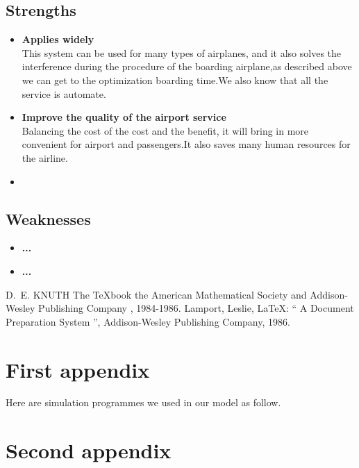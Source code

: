 \documentclass{mcmthesis}
\begin{document}
\subsection{Strengths}
\begin{itemize}
\item \textbf{Applies widely}\\
This  system can be used for many types of airplanes, and it also
solves the interference during  the procedure of the boarding
airplane,as described above we can get to the  optimization
boarding time.We also know that all the service is automate.
\item \textbf{Improve the quality of the airport service}\\
Balancing the cost of the cost and the benefit, it will bring in
more convenient  for airport and passengers.It also saves many
human resources for the airline. \item \textbf{}
\end{itemize}
\subsection{Weaknesses}
\begin{itemize}
  \item \textbf{...}
  \item \textbf{...}
\end{itemize}


\begin{thebibliography}{99}
 D.~E. KNUTH   The \TeX{}book  the American
Mathematical Society and Addison-Wesley
Publishing Company , 1984-1986.
Lamport, Leslie,  \LaTeX{}: `` A Document Preparation System '',
Addison-Wesley Publishing Company, 1986.
\end{thebibliography}

\begin{appendices}

\section{First appendix}

\indent \indent Here are simulation programmes we used in our model as follow.\\

% 

\section{Second appendix}

% 

\end{appendices}
\end{document}
